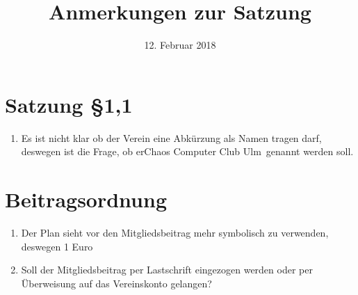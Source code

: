 \documentclass[a4paper, 12pt]{scrartcl}
\title{Anmerkungen zur Satzung}
\author{}
\date{12. Februar 2018}
\begin{document}
\maketitle
\sffamily

\section{Satzung §1,1}
\begin{enumerate}
  \item Es ist nicht klar ob der Verein eine Abkürzung als Namen tragen darf, deswegen ist die Frage, ob er\dq Chaos Computer Club Ulm \dq\,genannt werden soll.
\end{enumerate}

\section{Beitragsordnung}
\begin{enumerate}
	\item Der Plan sieht vor den Mitgliedsbeitrag mehr symbolisch zu verwenden, deswegen 1 Euro
	\item Soll der Mitgliedsbeitrag per Lastschrift eingezogen werden oder per Überweisung auf das Vereinskonto gelangen?
\end{enumerate}
\end{document}
